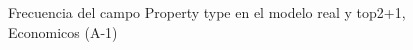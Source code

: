 \begin{figure}[H]
    \centering
    
    \caption{Frecuencia del campo Property type en el modelo real y top2+1, Economicos (A-1)}
    \label{frecuency-Property Type-top2+1}
\end{figure}